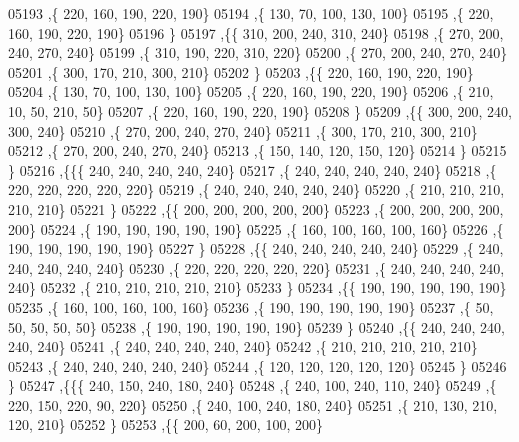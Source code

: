 \begin{DoxyCode}
05193     ,\{   220,   160,   190,   220,   190\}
05194     ,\{   130,    70,   100,   130,   100\}
05195     ,\{   220,   160,   190,   220,   190\}
05196     \}
05197    ,\{\{   310,   200,   240,   310,   240\}
05198     ,\{   270,   200,   240,   270,   240\}
05199     ,\{   310,   190,   220,   310,   220\}
05200     ,\{   270,   200,   240,   270,   240\}
05201     ,\{   300,   170,   210,   300,   210\}
05202     \}
05203    ,\{\{   220,   160,   190,   220,   190\}
05204     ,\{   130,    70,   100,   130,   100\}
05205     ,\{   220,   160,   190,   220,   190\}
05206     ,\{   210,    10,    50,   210,    50\}
05207     ,\{   220,   160,   190,   220,   190\}
05208     \}
05209    ,\{\{   300,   200,   240,   300,   240\}
05210     ,\{   270,   200,   240,   270,   240\}
05211     ,\{   300,   170,   210,   300,   210\}
05212     ,\{   270,   200,   240,   270,   240\}
05213     ,\{   150,   140,   120,   150,   120\}
05214     \}
05215    \}
05216   ,\{\{\{   240,   240,   240,   240,   240\}
05217     ,\{   240,   240,   240,   240,   240\}
05218     ,\{   220,   220,   220,   220,   220\}
05219     ,\{   240,   240,   240,   240,   240\}
05220     ,\{   210,   210,   210,   210,   210\}
05221     \}
05222    ,\{\{   200,   200,   200,   200,   200\}
05223     ,\{   200,   200,   200,   200,   200\}
05224     ,\{   190,   190,   190,   190,   190\}
05225     ,\{   160,   100,   160,   100,   160\}
05226     ,\{   190,   190,   190,   190,   190\}
05227     \}
05228    ,\{\{   240,   240,   240,   240,   240\}
05229     ,\{   240,   240,   240,   240,   240\}
05230     ,\{   220,   220,   220,   220,   220\}
05231     ,\{   240,   240,   240,   240,   240\}
05232     ,\{   210,   210,   210,   210,   210\}
05233     \}
05234    ,\{\{   190,   190,   190,   190,   190\}
05235     ,\{   160,   100,   160,   100,   160\}
05236     ,\{   190,   190,   190,   190,   190\}
05237     ,\{    50,    50,    50,    50,    50\}
05238     ,\{   190,   190,   190,   190,   190\}
05239     \}
05240    ,\{\{   240,   240,   240,   240,   240\}
05241     ,\{   240,   240,   240,   240,   240\}
05242     ,\{   210,   210,   210,   210,   210\}
05243     ,\{   240,   240,   240,   240,   240\}
05244     ,\{   120,   120,   120,   120,   120\}
05245     \}
05246    \}
05247   ,\{\{\{   240,   150,   240,   180,   240\}
05248     ,\{   240,   100,   240,   110,   240\}
05249     ,\{   220,   150,   220,    90,   220\}
05250     ,\{   240,   100,   240,   180,   240\}
05251     ,\{   210,   130,   210,   120,   210\}
05252     \}
05253    ,\{\{   200,    60,   200,   100,   200\}

\end{DoxyCode}
